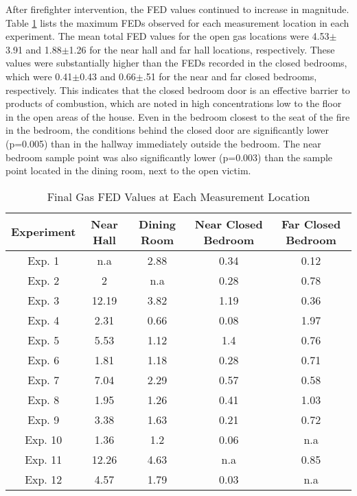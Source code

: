 \documentclass[12pt,oneside]{book}
\begin{document}
After firefighter intervention, the FED values continued to increase in magnitude. Table \ref{tab:final_fed} lists the maximum FEDs observed for each measurement location in each experiment. The mean total FED values for the open gas locations were 4.53$\pm$3.91 and 1.88$\pm$1.26 for the near hall and far hall locations, respectively. These values were substantially higher than the FEDs recorded in the closed bedrooms, which were 0.41$\pm$0.43 and 0.66$\pm$.51 for the near and far closed bedrooms, respectively. This indicates that the closed bedroom door is an effective barrier to products of combustion, which are noted in high concentrations low to the floor in the open areas of the house. Even in the bedroom closest to the seat of the fire in the bedroom, the conditions behind the closed door are significantly lower (p=0.005) than in the hallway immediately outside the bedroom. The near bedroom sample point was also significantly lower (p=0.003) than the sample point located in the dining room, next to the open victim.

\begin{table}[!ht]
    \centering
    \caption{Final Gas FED Values at Each Measurement Location}
    \label{tab:final_fed}
    \begin{tabular}{ccccc}
    \toprule[1.5pt]
\textbf{Experiment}  &   \textbf{Near Hall}& \textbf{Dining Room}& \textbf{Near Closed Bedroom}& \textbf{Far Closed Bedroom} \\ 
  \midrule                                                                   
Exp. 1 &       n.a&     2.88&         0.34&        0.12 \\  
Exp. 2 &         2&      n.a&         0.28&        0.78 \\
Exp. 3 &     12.19&     3.82&         1.19&        0.36 \\               
Exp. 4 &      2.31&     0.66&         0.08&        1.97 \\                
Exp. 5 &      5.53&     1.12&          1.4&        0.76 \\                 
Exp. 6 &      1.81&     1.18&         0.28&        0.71 \\                 
Exp. 7 &      7.04&     2.29&         0.57&        0.58 \\                
Exp. 8 &      1.95&     1.26&         0.41&        1.03 \\            
Exp. 9 &      3.38&     1.63&         0.21&        0.72 \\              
Exp. 10&      1.36&      1.2&         0.06&         n.a \\         
Exp. 11&     12.26&     4.63&          n.a&        0.85 \\             
Exp. 12&      4.57&     1.79&         0.03&         n.a \\           
 \bottomrule[1.25pt] 

    \end{tabular}
\end{table}
\end{document}
